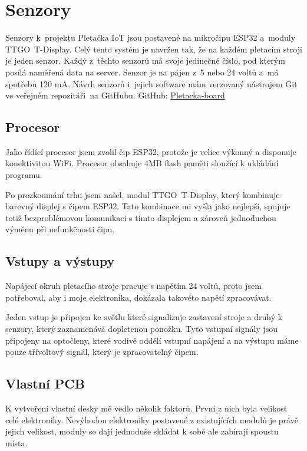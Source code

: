 \chapter{Senzory}

Senzory k~projektu Pletačka IoT jsou postavené na mikročipu ESP32 a~moduly TTGO~T-Display.
Celý tento systém je navržen tak, že na každém pletacím stroji je jeden senzor.
Každý z~těchto senzorů má svoje jedinečné číslo, pod kterým posílá naměřená data na server.
Senzor je na pájen z~5 nebo 24 voltů a~má spotřebu 120 mA.
Návrh senzorů i~jejich software mám verzovaný nástrojem Git ve veřejném repozitáři~na GitHubu.\newline
GitHub: \href{https://github.com/Pletacka-IoT/Pletacka-board}{Pletacka-board}\cite{PL_BOARD}

\section{Procesor}
Jako řídící procesor jsem zvolil čip ESP32, protože je velice výkonný a disponuje konektivitou WiFi.
Procesor obsahuje 4MB flash paměti sloužící k ukládání programu.

Po prozkoumání trhu jsem našel, modul TTGO~T-Display, který kombinuje barevný displej s čipem ESP32.
Tato kombinace mi vyšla jako nejlepší, spojuje totiž bezproblémovou komunikaci s tímto displejem a zároveň jednoduchou výměnu při nefunkčnosti čipu.


\section{Vstupy a výstupy}
Napájecí okruh pletacího stroje pracuje s napětím 24 voltů, proto jsem potřeboval, aby i moje elektronika, dokázala takovéto napětí zpracovávat.

Jeden vstup je připojen ke světlu které signalizuje zastavení stroje a druhý k senzory, který zaznamenává dopletenou ponožku.
Tyto vstupní signály jsou připojeny na optočleny, které vodivě oddělí vstupní napájení a na výstupu máme pouze třívoltový signál, který je zpracovatelný čipem.



\section{Vlastní PCB}

K vytvoření vlastní desky mě vedlo několik faktorů. První z nich byla velikost celé elektroniky. 
Nevýhodou elektroniky postavené z existujících modulů je právě jejich velikost, moduly se dají jednoduše skládat k sobě ale zabírají spoustu místa. 
 
